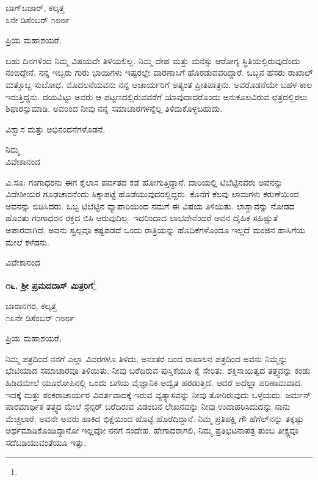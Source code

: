 \vspace{-0.5cm}

\begin{flushright}
ಬಾಗ್‌ಬಜಾರ್, ಕಲ್ಕತ್ತ\\೩ನೇ ಡಿಸೆಂಬರ್ ೧೮೮೯
\end{flushright}

\noindent
ಪ್ರಿಯ ಮಹಾಶಯರೆ,

ಬಹು ದಿನಗಳಿಂದ ನಿಮ್ಮ ವಿಷಯವೇ ತಿಳಿಯಲಿಲ್ಲ. ನಿಮ್ಮ ದೇಹ ಮತ್ತು ಮನಸ್ಸು ಆರೋಗ್ಯ ಸ್ಥಿತಿಯಲ್ಲಿರುವುದೆಂದು ನಂಬಿದ್ದೇನೆ. ನನ್ನ ಇಬ್ಬರು ಗುರು ಭಾಯಿಗಳು ಇಷ್ಟರಲ್ಲೇ ವಾರಣಾಸಿಗೆ ಹೊರಡುವವರಿದ್ದಾರೆ. ಒಬ್ಬನ ಹೆಸರು ರಾಖಾಲ್ ಮತ್ತೊಬ್ಬ ಸುಬೋಧ. ಮೊದಲನೆಯವನು ನನ್ನ ಆಚಾರ್ಯರಿಗೆ ಅತ್ಯಂತ ಪ್ರೀತಿಪಾತ್ರನು. ಅವರೊಡನೆಯೇ ಬಹಳ ಕಾಲ ಇರುತ್ತಿದ್ದನು. ದಯವಿಟ್ಟು ಅವರು ಆ ಪಟ್ಟಣದಲ್ಲಿರುವವರೆಗೆ ಯಾವುದಾದರೊಂದು ಅನುಕೂಲವಿರುವ ಛತ್ರದಲ್ಲಿರಲು ಶಿಫಾರಸ್ಸುಮಾಡಿ. ಅವರಿಂದ ನೀವು ನನ್ನ ಸಮಾಚಾರಗಳನ್ನೆಲ್ಲ ತಿಳಿದುಕೊಳ್ಳಬಹುದು.

\eject

ವಿಶ್ವಾಸ ಮತ್ತು ಅಭಿನಂದನೆಗಳೊಡನೆ,

{\flushright
ನಿಮ್ಮ\\ವಿವೇಕಾನಂದ\par}

ವಿ.ಸೂ: ಗಂಗಾಧರನು ಈಗ ಕೈಲಾಸ ಪರ್ವತದ ಕಡೆ ಹೋಗುತ್ತಿದ್ದಾನೆ. ದಾರಿಯಲ್ಲಿ ಟಿಬೆಟ್ಟಿನವರು ಅವನನ್ನು ವಿದೇಶೀಯರ ಗೂಢಚಾರನೆಂದು ಸಿಕ್ಕಾಪಟ್ಟೆ ಹೊಡೆಯುವುದರಲ್ಲಿದ್ದರು. ಕೊನೆಗೆ ಕೆಲವು ಲಾಮಗಳು ಕರುಣೆಯಿಂದ ಅವನನ್ನು ಬಿಡಿಸಿದರು. ಒಬ್ಬ ಟಿಬೆಟ್ಟಿನ ವ್ಯಾಪಾರಿಯಿಂದ ನಮಗೆ ಈ ವಿಷಯ ತಿಳಿಯಿತು. ಲಾಸ್ಹಾವನ್ನು ನೋಡದ ಹೊರತು ಗಂಗಾಧರನ ರಕ್ತದ ಬಿಸಿ ಆರುವುದಿಲ್ಲ. ಇದರಿಂದಾದ ಲಾಭವೇನೆಂದರೆ ಅವನ ದೈಹಿಕ ಸಹಿಷ್ಣುತೆ ಅಪಾರವಾಗಿದೆ. ಅವನು ಸ್ವಲ್ಪವೂ ಕಷ್ಟಪಡದೆ ಒಂದು ರಾತ್ರಿಯನ್ನು ಹೊದಿಕೆಗಳೊಂದೂ ಇಲ್ಲದೆ ಮಂಜಿನ ಹಾಸಿಗೆಯ ಮೇಲೆ ಕಳೆದನು.

{\flushright
ವಿವೇಕಾನಂದ\par}

\begin{center}
\textbf{೧೬. ಶ‍್ರೀ ಪ್ರಮದದಾಸ್ ಮಿತ್ರರಿಗೆ}\footnote{}
\end{center}

\begin{flushright}
ಬಾರಾನಗರ, ಕಲ್ಕತ್ತ\\೧೩ನೇ ಡಿಸೆಂಬರ್ ೧೮೮೯
\end{flushright}

\noindent
ಪ್ರಿಯ ಮಹಾಶಯರೆ,

ನಿಮ್ಮ ಪತ್ರದಿಂದ ನನಗೆ ಎಲ್ಲಾ ವಿವರಗಳೂ ತಿಳಿದು, ಅನಂತರ ಬಂದ ರಾಖಾಲನ ಪತ್ರದಿಂದ ಅವನು ನಿಮ್ಮನ್ನು ಭೇಟಿಯಾದ ಸಮಾಚಾರವೂ ತಿಳಿಯಿತು. ನೀವು ಬರೆದಿರುವ ಪುಸ್ತಿಕೆಯೂ ಕೈ ಸೇರಿತು. ಶಕ್ತಿಸಾಯಿತ್ವದ ತತ್ತ್ವವನ್ನು ಕಂಡು ಹಿಡಿದಮೇಲೆ ಯೂರೋಪಿನಲ್ಲಿ ಒಂದು ಬಗೆಯ ವೈಜ್ಞಾನಿಕ ಅದ್ವೈತ ಹರಡುತ್ತಿದೆ. ಆದರೆ ಅದೆಲ್ಲಾ ಪರಿಣಾಮವಾದ. ಇದಕ್ಕೆ ಮತ್ತು ಶಂಕರಾಚಾರ್ಯರ ವಿವರ್ತವಾದಕ್ಕೆ ಇರುವ ವ್ಯತ್ಯಾಸವನ್ನು ನೀವು ತೋರಿರುವುದು ಒಳ್ಳೆಯದು. ಜರ್ಮನ್ ಪಾರಮಾರ್ಥಿಕ ತತ್ತ್ವದ ಮೇಲೆ ಸ್ಪೆನ್ಸರ್ ಬರೆದಿರುವ ವಿಡಂಬನ ಲೇಖನವನ್ನು ನೀವು ಉದಾಹರಿಸಿದುದನ್ನು ನಾನು ಮೆಚ್ಚಲಾರೆ. ಅವನೇ ಅವರು ಹಾಕಿದ ಭಿಕ್ಷೆಯಿಂದ ಹೊಟ್ಟೆ ಹೊರೆದಿದ್ದಾನೆ. ನಿಮ್ಮ ಪ್ರತಿಪಕ್ಷಿ ಗೌ  ಹೆಗೆಲ್‌ನನ್ನು ತಕ್ಕಷ್ಟು ಅರ್ಥಮಾಡಿಕೊಂಡಿದ್ದಾನೋ ಇಲ್ಲವೋ ನನಗೆ ಸಂದೇಹ. ಹೇಗಾದರಾಗಲಿ, ನಿಮ್ಮ ಪ್ರತಿಭಟನಾಪತ್ರ ತುಂಬ ತೀಕ್ಷ್ಣವೂ ಸದೆಬಡಿಯುವಂತೆಯೂ ಇತ್ತು.

